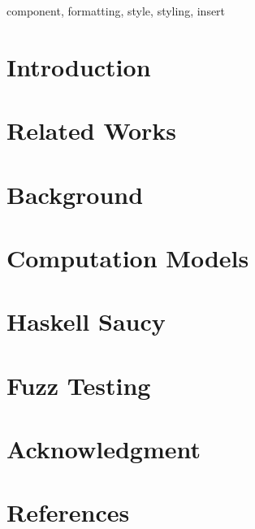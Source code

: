 \documentclass[conference]{IEEEtran}
\begin{document}
\begin{IEEEkeywords}
component, formatting, style, styling, insert
\end{IEEEkeywords}

\section{Introduction}


\section{Related Works}


\section{Background} \label{sec:background}


\section{Computation Models} \label{sec:wrappers}


\section{Haskell Saucy}


\section{Fuzz Testing}


%

%

\section*{Acknowledgment}

\section*{References}

\appendix


\pagebreak
\end{document}
